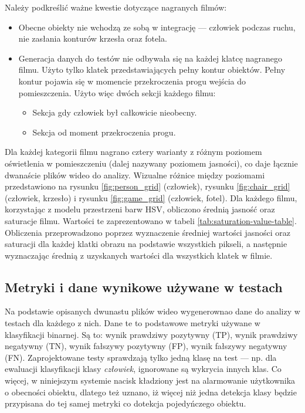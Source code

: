Należy podkreślić ważne kwestie dotyczące nagranych filmów:
\begin{itemize}
    \item Obecne obiekty nie wchodzą ze sobą w integrację --- człowiek podczas ruchu, nie zasłania konturów krzesła oraz fotela.
    \item Generacja danych do testów nie odbywała się na każdej klatcę nagranego filmu. Użyto tylko klatek przedstawiających pełny kontur obiektów. Pełny kontur pojawia się w momencie przekroczenia progu wejścia do pomieszczenia. Użyto więc dwóch sekcji każdego filmu:
    \begin{itemize}
        \item Sekcja gdy człowiek był całkowicie nieobecny.
        \item Sekcja od moment przekroczenia progu.
    \end{itemize}
\end{itemize}

Dla każdej kategorii filmu nagrano cztery warianty z różnym poziomem oświetlenia w pomieszczeniu (dalej nazywany poziomem jasności), co daje łącznie dwanaście plików wideo do analizy. Wizualne różnice między poziomami przedstawiono na rysunku \ref{fig:person_grid} (człowiek), rysunku \ref{fig:chair_grid} (człowiek, krzesło) i rysunku \ref{fig:game_grid} (człowiek, fotel). 
Dla każdego filmu, korzystając z modelu przestrzeni barw HSV, obliczono średnią jasność oraz saturacje filmu. Wartości te zaprezentowano w tabeli \ref{tab:saturation-value-table}. Obliczenia przeprowadzono poprzez wyznaczenie średniej wartości jasności oraz saturacji dla każdej klatki obrazu na podstawie wszystkich pikseli, a następnie wyznaczając średnią z uzyskanych wartości dla wszystkich klatek w filmie.











\subsection{Metryki i dane wynikowe używane w testach}
Na podstawie opisanych dwunastu plików wideo wygenerownao dane do analizy w testach dla każdego z nich. Dane te to podstawowe metryki używane w klasyfikacji binarnej. Są to: wynik prawdziwy pozytywny (TP), wynik prawdziwy negatywny (TN), wynik fałszywy pozytywny (FP), wynik fałszywy negatywny (FN). 
Zaprojektowane testy sprawdzają tylko jedną klasę na test --- np. dla ewaluacji klasyfikacji klasy \emph{człowiek}, ignorowane są wykrycia innych klas. Co więcej, w niniejszym systemie nacisk kładziony jest na alarmowanie użytkownika o obecności obiektu, dlatego też uznano, iż więcej niż jedna detekcja klasy będzie przypisana do tej samej metryki co dotekcja pojedyńczego obiektu. 

